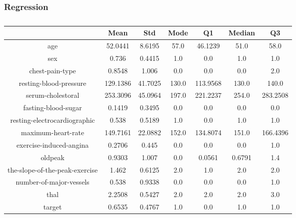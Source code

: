 \documentclass{classrep}
\begin{document}
{{{            }

            \subsubsection{Regression}
            \label{results:30-percent:regression} {

                \begin{table}[!htbp]
                    \centering
                    \begin{tabular}{|c|c|c|c|c|c|c|}
                        \hline
                        & Mean & Std & Mode & Q1 & Median & Q3 \\ \hline
                        age & 52.0441 & 8.6195 & 57.0 & 46.1239 & 51.0 & 58.0 \\ \hline
                        sex & 0.736 & 0.4415 & 1.0 & 0.0 & 1.0 & 1.0 \\ \hline
                        chest-pain-type & 0.8548 & 1.006 & 0.0 & 0.0 & 0.0 & 2.0 \\ \hline
                        resting-blood-pressure & 129.1386 & 41.7025 & 130.0 & 113.9568 & 130.0 & 140.0 \\ \hline
                        serum-cholestoral & 253.3096 & 45.0964 & 197.0 & 221.2237 & 254.0 & 283.2508 \\ \hline
                        fasting-blood-sugar & 0.1419 & 0.3495 & 0.0 & 0.0 & 0.0 & 0.0 \\ \hline
                        resting-electrocardiographic & 0.538 & 0.5189 & 1.0 & 0.0 & 1.0 & 1.0 \\ \hline
                        maximum-heart-rate & 149.7161 & 22.0882 & 152.0 & 134.8074 & 151.0 & 166.4396 \\ \hline
                        exercise-induced-angina & 0.2706 & 0.445 & 0.0 & 0.0 & 0.0 & 1.0 \\ \hline
                        oldpeak & 0.9303 & 1.007 & 0.0 & 0.0561 & 0.6791 & 1.4 \\ \hline
                        the-slope-of-the-peak-exercise & 1.462 & 0.6125 & 2.0 & 1.0 & 2.0 & 2.0 \\ \hline
                        number-of-major-vessels & 0.538 & 0.9338 & 0.0 & 0.0 & 0.0 & 1.0 \\ \hline
                        thal & 2.2508 & 0.5427 & 2.0 & 2.0 & 2.0 & 3.0 \\ \hline
                        target & 0.6535 & 0.4767 & 1.0 & 0.0 & 1.0 & 1.0 \\ \hline
                    \end{tabular}
                    \caption{}
                    \label{result_30_Regression}
                \end{table}
                \FloatBarrier

}}}
\end{document}
